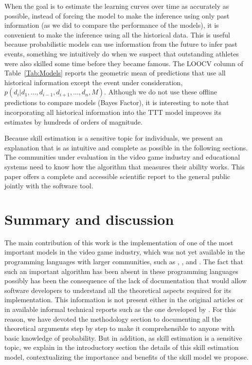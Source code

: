 \documentclass[article]{jss}
\begin{document}

When the goal is to estimate the learning curves over time as accurately as possible, instead of forcing the model to make the inference using only past information (as we did to compare the performance of the models), it is convenient to make the inference using all the historical data.
This is useful because probabilistic models can use information from the future to infer past events, something we intuitively do when we suspect that outstanding athletes were also skilled some time before they became famous.
The LOOCV column of Table~\ref{Tab:Models} reports the geometric mean of predictions that use all historical information except the event under consideration, $p(d_i| d_1, \dots, d_{i-1}, d_{i+1}, \dots, d_n , M)$.
Although we do not use these offline predictions to compare models (Bayes Factor), it is interesting to note that incorporating all historical information into the TTT model improves its estimates by hundreds of orders of magnitude.


Because skill estimation is a sensitive topic for individuals, we present an explanation that is as intuitive and complete as possible in the following sections.
The communities under evaluation in the video game industry and educational systems need to know how the algorithm that measures their ability works.
This paper offers a complete and accessible scientific report to the general public jointly with the software tool.



\section{Summary and discussion} \label{sec:summary}

The main contribution of this work is the implementation of one of the most important models in the video game industry, which was not yet available in the programming languages with larger communities, such as , , and .
The fact that such an important algorithm has been absent in these programming languages possibly has been the consequence of the lack of documentation that would allow software developers to understand all the theoretical aspects required for its implementation.
This information is not present either in the original articles \citep{Herbrich2007, Dangauthier2007} or in available informal technical reports such as the one developed by \cite{Mosser2011}. 
For this reason, we have devoted the methodology section to documenting all the theoretical arguments step by step to make it comprehensible to anyone with basic knowledge of probability. 
But in addition, as skill estimation is a sensitive topic, we explain in the introductory section the details of this skill estimation model, contextualizing the importance and benefits of the skill model we propose.
\end{document}
